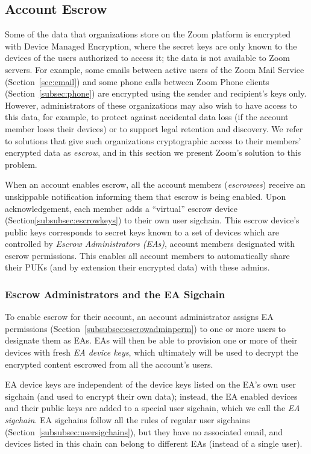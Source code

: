 \subsection{Account Escrow}
\label{subsec:keyescrow}

Some of the data that organizations store on the Zoom platform is encrypted with Device Managed Encryption, where the secret keys are only
known to the devices of the users authorized to access it; the data is not available to Zoom
servers. For example, some emails between active users of the Zoom Mail Service (Section~\ref{sec:email})
and some phone calls between Zoom Phone clients (Section~\ref{subsec:phone}) are
encrypted using the sender and recipient's keys only. However, administrators of these organizations
may also wish to have access to this data, for example, to protect against accidental data loss (if
the account member loses their devices) or to support legal retention and discovery. We refer to
solutions that give such organizations cryptographic access to their members' encrypted data as
\textit{escrow}, and in this section we present Zoom's solution to this problem.

When an account enables escrow, all the account members (\emph{escrowees}) receive an unskippable
notification informing them that escrow is being enabled. Upon acknowledgement, each member adds a
``virtual'' escrow device (Section\ref{subsubsec:escrowkeys}) to their own user sigchain. This
escrow device's public keys corresponds to secret keys known to a set of devices which are
controlled by \emph{Escrow Administrators (EAs)}, account members designated with escrow
permissions. This enables all account members to automatically share their PUKs (and by extension
their encrypted data) with these admins.

\subsubsection{Escrow Administrators and the EA Sigchain}
\label{subsubsec:escrowadmins}

To enable escrow for their account, an account administrator assigns EA permissions
(Section~\ref{subsubsec:escrowadminperm}) to one or more users to designate them as EAs. EAs will
then be able to provision one or more of their devices with fresh \emph{EA device keys}, which
ultimately will be used to decrypt the encrypted content escrowed from all the account's users.

EA device keys are independent of the device keys listed on the EA's own user sigchain (and used to
encrypt their own data); instead, the EA enabled devices and their public keys are added to a
special user sigchain, which we call the \emph{EA sigchain}. EA sigchains follow all the rules of
regular user sigchains (Section~\ref{subsubsec:usersigchains}), but they have no associated email,
and devices listed in this chain can belong to different EAs (instead of a single user).

